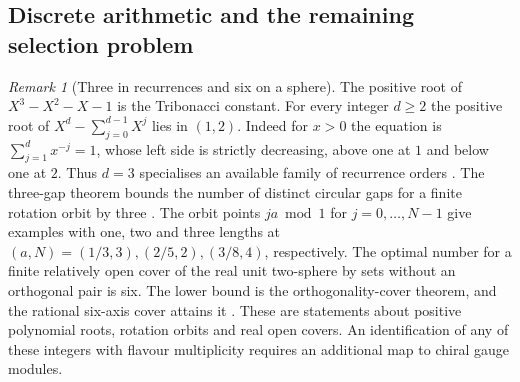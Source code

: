 \documentclass[aps,pra,onecolumn,superscriptaddress,nofootinbib,10pt]{revtex4-2}
\theoremstyle{definition}
\theoremstyle{remark}
\newtheorem{remark}[theorem]{Remark}
\begin{document}
\subsection{Discrete arithmetic and the remaining selection problem}\label{gn:boundary}

\begin{remark}[Three in recurrences and six on a sphere]\label{gn:leandiscrete}
The positive root of $X^3-X^2-X-1$ is the Tribonacci constant.
For every integer $d\ge2$ the positive root of
$X^d-\sum_{j=0}^{d-1}X^j$ lies in $(1,2)$.
Indeed for $x>0$ the equation is $\sum_{j=1}^d x^{-j}=1$,
whose left side is strictly decreasing, above one at $1$ and
below one at $2$. Thus $d=3$ specialises an available family
of recurrence orders \cite[DBonacci/PerronRoot]{ub:lean}.
The three-gap theorem bounds the
number of distinct circular gaps for a finite rotation orbit
by three \cite{gn:sos,ub:lean}. The orbit points $j a\bmod1$ for
$j=0,\ldots,N-1$ give examples with one, two and three lengths
at $(a,N)=(1/3,3),(2/5,2),(3/8,4)$, respectively.
The optimal number for a finite relatively open cover of the
real unit two-sphere by sets without an orthogonal pair is six.
The lower bound is the orthogonality-cover theorem, and the
rational six-axis cover attains it \cite{ub:lean}.
These are statements about positive polynomial roots, rotation
orbits and real open covers. An identification of any of these
integers with flavour multiplicity requires an additional map
to chiral gauge modules.
\end{remark}
\end{document}
